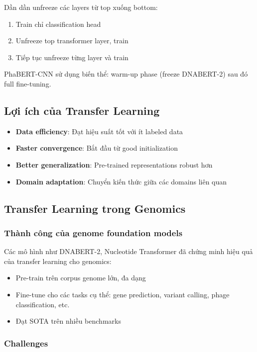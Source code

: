 Dần dần unfreeze các layers từ top xuống bottom:
\begin{enumerate}
    \item Train chỉ classification head
    \item Unfreeze top transformer layer, train
    \item Tiếp tục unfreeze từng layer và train
\end{enumerate}

PhaBERT-CNN sử dụng biến thể: warm-up phase (freeze DNABERT-2) sau đó full fine-tuning.

\subsection{Lợi ích của Transfer Learning}

\begin{itemize}
    \item \textbf{Data efficiency}: Đạt hiệu suất tốt với ít labeled data
    \item \textbf{Faster convergence}: Bắt đầu từ good initialization
    \item \textbf{Better generalization}: Pre-trained representations robust hơn
    \item \textbf{Domain adaptation}: Chuyển kiến thức giữa các domains liên quan
\end{itemize}

\subsection{Transfer Learning trong Genomics}

\subsubsection{Thành công của genome foundation models}

Các mô hình như DNABERT-2, Nucleotide Transformer đã chứng minh hiệu quả của transfer learning cho genomics:
\begin{itemize}
    \item Pre-train trên corpus genome lớn, đa dạng
    \item Fine-tune cho các tasks cụ thể: gene prediction, variant calling, phage classification, etc.
    \item Đạt SOTA trên nhiều benchmarks
\end{itemize}

\subsubsection{Challenges}


